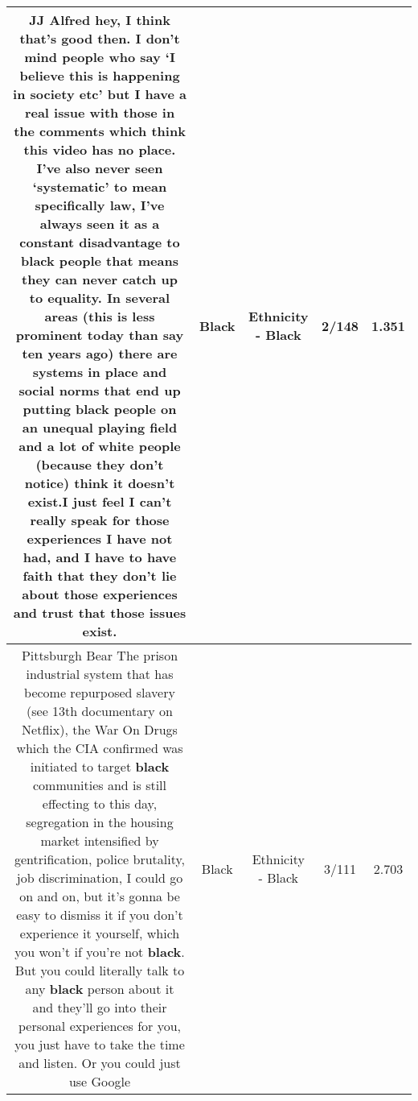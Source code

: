 \documentclass[11pt]{article}
\newlength\mylength
\begin{document}
\begin{center}
\begin{longtable}{|C{.65\mylength}|C{.30\mylength}|C{.12\mylength}|C{.12\mylength}|C{.12\mylength}|}
  \small JJ Alfred hey, I think that's good then. I don't mind people who say ‘I believe this is happening in society etc' but I have a real issue with those in the comments which think this video has no place. I've also never seen ‘systematic' to mean specifically law, I've always seen it as a constant disadvantage to \textbf{black} people that means they can never catch up to equality. In several areas (this is less prominent today than say ten years ago) there are systems in place and social norms that end up putting \textbf{black} people on an unequal playing field and a lot of white people (because they don't notice) think it doesn't exist.I just feel I can't really speak for those experiences I have not had, and I have to have faith that they don't lie about those experiences and trust that those issues exist.\normalsize   & Black & Ethnicity - Black & 2/148 & 1.351 \\  \hline
  \small Pittsburgh Bear The prison industrial system that has become repurposed slavery (see 13th documentary on Netflix), the War On Drugs which the CIA confirmed was initiated to target \textbf{black} communities and is still effecting to this day, segregation in the housing market intensified by gentrification, police brutality, job discrimination, I could go on and on, but it's gonna be easy to dismiss it if you don't experience it yourself, which you won't if you're not \textbf{black}. But you could literally talk to any \textbf{black} person about it and they'll go into their personal experiences for you, you just have to take the time and listen. Or you could just use Google\normalsize   & Black & Ethnicity - Black & 3/111 & 2.703 \\  \hline

\end{longtable}
\end{center}
\end{document}
